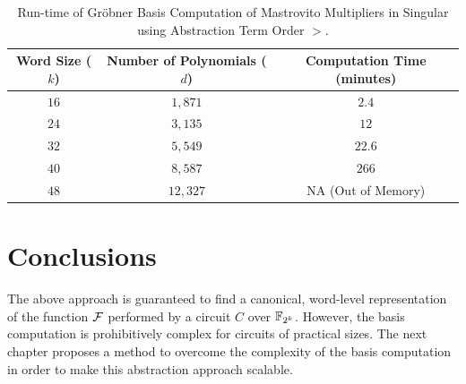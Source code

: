 \begin{table}[H]
\label{tab:slimgb}
	\begin{center}
	    \caption{Run-time of Gr\"obner Basis Computation of Mastrovito Multipliers in Singular using Abstraction Term Order $>$.}\label{tab:sT}
	    \begin{tabular}{|c|c||c|} 
	        \hline
		Word Size ($k$) & Number of Polynomials ($d$) & Computation Time (minutes)   \\
		\hline
	        $16$	&  $1,871$  & $2.4$ \\
		$24$	&  $3,135$  & $12$  \\
	        $32$	&  $5,549$  & $22.6$ \\
	        $40$	&  $8,587$  & $266$ \\
		$48$	& $12,327$  & NA (Out of Memory) \\
	        \hline
	    \end{tabular}
	\end{center} 
\end{table}

\section{Conclusions}
The above approach is guaranteed to find a canonical, word-level 
representation of the function ${\mathcal{F}}$ performed by a circuit $C$ over 
${\mathbb{F}}_{2^k}$. However, the \Grobner basis computation is prohibitively complex for
circuits of practical sizes. The next chapter proposes a 
method to overcome the complexity of the \Grobner
basis computation in order to make this abstraction approach scalable.
